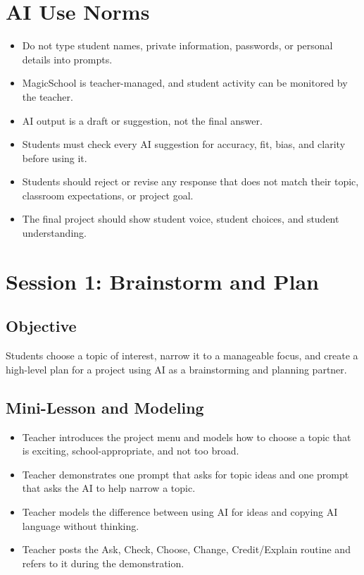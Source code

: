 \documentclass[11pt]{article}
\begin{document}
\section*{AI Use Norms}
\begin{itemize}
\item Do not type student names, private information, passwords, or personal details into prompts.
\item MagicSchool is teacher-managed, and student activity can be monitored by the teacher.
\item AI output is a draft or suggestion, not the final answer.
\item Students must check every AI suggestion for accuracy, fit, bias, and clarity before using it.
\item Students should reject or revise any response that does not match their topic, classroom expectations, or project goal.
\item The final project should show student voice, student choices, and student understanding.
\end{itemize}

\section*{Session 1: Brainstorm and Plan}
\subsection*{Objective}
Students choose a topic of interest, narrow it to a manageable focus, and create a high-level plan for a project using AI as a brainstorming and planning partner.

\subsection*{Mini-Lesson and Modeling}
\begin{itemize}
\item Teacher introduces the project menu and models how to choose a topic that is exciting, school-appropriate, and not too broad.
\item Teacher demonstrates one prompt that asks for topic ideas and one prompt that asks the AI to help narrow a topic.
\item Teacher models the difference between using AI for ideas and copying AI language without thinking.
\item Teacher posts the Ask, Check, Choose, Change, Credit/Explain routine and refers to it during the demonstration.
\end{itemize}
\end{document}
